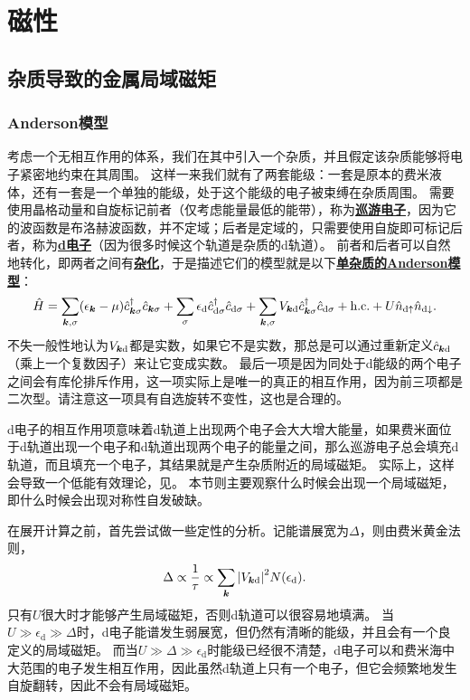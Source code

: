 \documentclass[hyperref, UTF8, a4paper]{ctexart}
\renewcommand{\autoref}{\prettyref}
\newcommand*{\concept}[1]{\underline{\textbf{#1}}}
\begin{document}
\section{磁性}

\subsection{杂质导致的金属局域磁矩}

\subsubsection{Anderson模型}\label{sec:anderson-model}

考虑一个无相互作用的体系，我们在其中引入一个杂质，并且假定该杂质能够将电子紧密地约束在其周围。
这样一来我们就有了两套能级：一套是原本的费米液体，还有一套是一个单独的能级，处于这个能级的电子被束缚在杂质周围。
需要使用晶格动量和自旋标记前者（仅考虑能量最低的能带），称为\concept{巡游电子}，因为它的波函数是布洛赫波函数，并不定域；后者是定域的，只需要使用自旋即可标记后者，称为\concept{d电子}（因为很多时候这个轨道是杂质的d轨道）。
前者和后者可以自然地转化，即两者之间有\concept{杂化}，于是描述它们的模型就是以下\concept{单杂质的Anderson模型}：
\begin{equation}
    \hat{H} = \sum_{\vb*{k}, \sigma} (\epsilon_{\vb*{k}} - \mu) \hat{c}_{\vb*{k}\sigma}^\dagger \hat{c}_{\vb*{k} \sigma} + \sum_\sigma \epsilon_\text{d} \hat{c}_{\text{d}\sigma}^\dagger \hat{c}_{\text{d} \sigma} + \sum_{\vb*{k}, \sigma} V_{\vb*{k} \text{d}} \hat{c}_{\vb*{k} \sigma}^\dagger \hat{c}_{\text{d} \sigma} + \text{h.c.} + U \hat{n}_{\text{d} \uparrow} \hat{n}_{\text{d} \downarrow}.
    \label{eq:impurity-anderson}
\end{equation}
不失一般性地认为$V_{\vb*{k} \text{d}}$都是实数，如果它不是实数，那总是可以通过重新定义$\hat{c}_{\vb*{k} \text{d}}$（乘上一个复数因子）来让它变成实数。
最后一项是因为同处于d能级的两个电子之间会有库伦排斥作用，这一项实际上是唯一的真正的相互作用，因为前三项都是二次型。请注意这一项具有自选旋转不变性，这也是合理的。

d电子的相互作用项意味着d轨道上出现两个电子会大大增大能量，如果费米面位于d轨道出现一个电子和d轨道出现两个电子的能量之间，那么巡游电子总会填充d轨道，而且填充一个电子，其结果就是产生杂质附近的局域磁矩。
实际上，这样会导致一个低能有效理论，见\autoref{sec:kondo-effect}。
本节则主要观察什么时候会出现一个局域磁矩，即什么时候会出现对称性自发破缺。

在展开计算之前，首先尝试做一些定性的分析。记能谱展宽为$\Delta$，则由费米黄金法则，
\[
    \Delta \propto \frac{1}{\tau} \propto \sum_{\vb*{k}} \abs{V_{\vb*{k} \text{d}}}^2 N(\epsilon_\text{d}).
\]
只有$U$很大时才能够产生局域磁矩，否则d轨道可以很容易地填满。
当$U \gg \epsilon_\text{d} \gg \Delta$时，d电子能谱发生弱展宽，但仍然有清晰的能级，并且会有一个良定义的局域磁矩。
而当$U \gg \Delta \gg \epsilon_\text{d}$时能级已经很不清楚，d电子可以和费米海中大范围的电子发生相互作用，因此虽然d轨道上只有一个电子，但它会频繁地发生自旋翻转，因此不会有局域磁矩。
\end{document}
